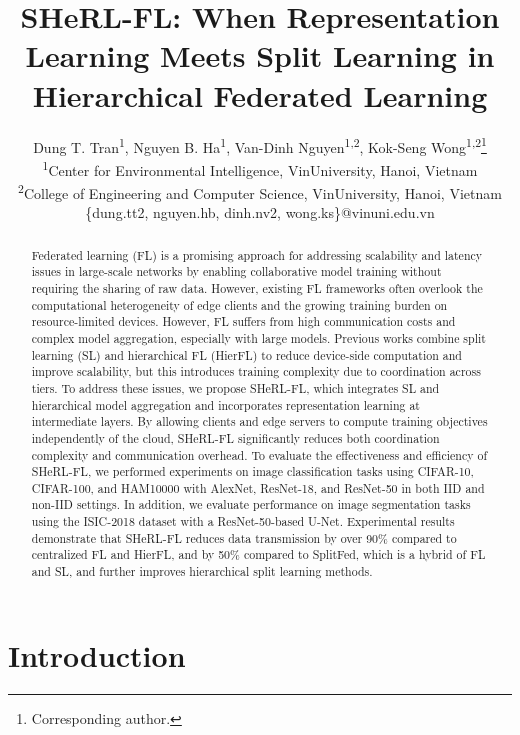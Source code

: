 \documentclass[letterpaper]{article} %
\title{SHeRL-FL: When Representation Learning Meets Split Learning in Hierarchical Federated Learning}
\author{\normalfont
    Dung T. Tran\textsuperscript{\rm 1},
    Nguyen B. Ha\textsuperscript{\rm 1},
    Van-Dinh Nguyen\textsuperscript{\rm 1,2},
    Kok-Seng Wong\textsuperscript{\rm 1,2}\thanks{Corresponding author.} \\
    \textsuperscript{\rm 1}Center for Environmental Intelligence, VinUniversity, Hanoi, Vietnam \\
    \textsuperscript{\rm 2}College of Engineering and Computer Science, VinUniversity, Hanoi, Vietnam \\
    \{dung.tt2, nguyen.hb, dinh.nv2, wong.ks\}@vinuni.edu.vn
}
\begin{document}
\maketitle

\begin{abstract}
    Federated learning (FL) is a promising approach for addressing scalability and latency issues in large-scale networks by enabling collaborative model training without requiring the sharing of raw data. However, existing FL frameworks often overlook the computational heterogeneity of edge clients and the growing training burden on resource-limited devices. However, FL suffers from high communication costs and complex model aggregation, especially with large models. Previous works combine split learning (SL) and hierarchical FL (HierFL) to reduce device-side computation and improve scalability, but this introduces training complexity due to coordination across tiers. To address these issues, we propose SHeRL-FL, which integrates SL and hierarchical model aggregation and incorporates representation learning at intermediate layers. By allowing clients and edge servers to compute training objectives independently of the cloud, SHeRL-FL significantly reduces both coordination complexity and communication overhead. To evaluate the effectiveness and efficiency of SHeRL-FL, we performed experiments on image classification tasks using CIFAR-10, CIFAR-100, and HAM10000 with AlexNet, ResNet-18, and ResNet-50 in both IID and non-IID settings. In addition, we evaluate performance on image segmentation tasks using the ISIC-2018 dataset with a ResNet-50-based U-Net. Experimental results demonstrate that SHeRL-FL reduces data transmission by over 90\% compared to centralized FL and HierFL, and by 50\% compared to SplitFed, which is a hybrid of FL and SL, and further improves hierarchical split learning methods. 
\end{abstract}


\section{Introduction}
\end{document}
